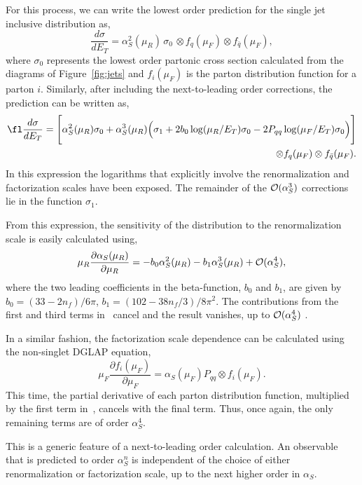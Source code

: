 \documentclass[12pt]{iopart}
\def\as{\alpha_S}
\begin{document}
For this process, we can write the lowest order prediction for the single jet
inclusive distribution as,
\begin{equation}
\frac{d\sigma}{dE_T}=\as^2(\mu_R) \, \sigma_0 \, 
 \otimes f_q(\mu_F) \otimes f_{\bar q}(\mu_F),
\end{equation}
where $\sigma_0$ represents the lowest order partonic cross section calculated
from the diagrams of Figure~\ref{fig:jets} and $f_i(\mu_F)$ is the parton
distribution function for a parton $i$. Similarly, after including the
next-to-leading order corrections, the prediction can be written as,
\begin{eqnarray}
\fl
\frac{d\sigma}{dE_T} = \Biggl[ \as^2(\mu_R) \sigma_0
 + \as^3(\mu_R) \Bigl(
   \sigma_1 + 2b_0 \log(\mu_R/E_T) \sigma_0
   -2 P_{qq} \log(\mu_F/E_T) \sigma_0 \Bigr) \Biggr] 
   \nonumber \\
 \otimes f_q(\mu_F) \otimes f_{\bar q}(\mu_F).
\label{eq:nlomudep}
\end{eqnarray}
In this expression the logarithms that explicitly involve the renormalization
and factorization scales have been exposed. The remainder of the
${\cal O}(\as^3)$ corrections lie in the function $\sigma_1$.

From this expression, the sensitivity of the distribution to the renormalization
scale is easily calculated using,
\begin{equation}
\mu_R \frac{\partial \as(\mu_R)}{\partial \mu_R} 
 = -b_0 \as^2(\mu_R) - b_1 \as^3(\mu_R) + {\cal O}(\as^4),
\end{equation}
where the two leading coefficients in the beta-function, $b_0$ and $b_1$, are given
by $b_0=(33-2n_f)/6\pi$, $b_1=(102-38n_f/3)/8\pi^2$.
The contributions from the first and third
terms in~ cancel and the result vanishes, up to
${\cal O}(\as^4)$ .

In a similar fashion, the factorization scale dependence can be calculated
using the non-singlet DGLAP equation,
\begin{equation}
\mu_F \frac{\partial f_i(\mu_F)}{\partial \mu_F} =
 \as(\mu_F) P_{qq} \otimes f_i(\mu_F).
\end{equation}
This time, the partial derivative of each parton distribution function, 
multiplied by the first term in~, cancels with 
the final term. Thus, once again, the only remaining terms are of
order $\as^4$.

This is a generic feature of a next-to-leading order calculation. An observable
that is predicted to order $\as^n$ is independent of the choice of either
renormalization or factorization scale, up to the next higher order in $\as$.
\end{document}

